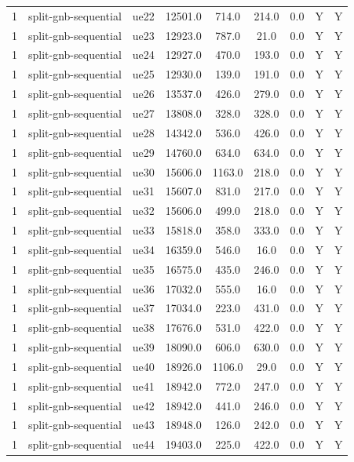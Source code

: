 \begin{table}[ht]
\begin{tabular}{|c|c|c|c|c|c|c|c|c|}
1 & split-gnb-sequential & ue22 & 12501.0 & 714.0 & 214.0 & 0.0 & Y & Y \\
1 & split-gnb-sequential & ue23 & 12923.0 & 787.0 & 21.0 & 0.0 & Y & Y \\
1 & split-gnb-sequential & ue24 & 12927.0 & 470.0 & 193.0 & 0.0 & Y & Y \\
1 & split-gnb-sequential & ue25 & 12930.0 & 139.0 & 191.0 & 0.0 & Y & Y \\
1 & split-gnb-sequential & ue26 & 13537.0 & 426.0 & 279.0 & 0.0 & Y & Y \\
1 & split-gnb-sequential & ue27 & 13808.0 & 328.0 & 328.0 & 0.0 & Y & Y \\
1 & split-gnb-sequential & ue28 & 14342.0 & 536.0 & 426.0 & 0.0 & Y & Y \\
1 & split-gnb-sequential & ue29 & 14760.0 & 634.0 & 634.0 & 0.0 & Y & Y \\
1 & split-gnb-sequential & ue30 & 15606.0 & 1163.0 & 218.0 & 0.0 & Y & Y \\
1 & split-gnb-sequential & ue31 & 15607.0 & 831.0 & 217.0 & 0.0 & Y & Y \\
1 & split-gnb-sequential & ue32 & 15606.0 & 499.0 & 218.0 & 0.0 & Y & Y \\
1 & split-gnb-sequential & ue33 & 15818.0 & 358.0 & 333.0 & 0.0 & Y & Y \\
1 & split-gnb-sequential & ue34 & 16359.0 & 546.0 & 16.0 & 0.0 & Y & Y \\
1 & split-gnb-sequential & ue35 & 16575.0 & 435.0 & 246.0 & 0.0 & Y & Y \\
1 & split-gnb-sequential & ue36 & 17032.0 & 555.0 & 16.0 & 0.0 & Y & Y \\
1 & split-gnb-sequential & ue37 & 17034.0 & 223.0 & 431.0 & 0.0 & Y & Y \\
1 & split-gnb-sequential & ue38 & 17676.0 & 531.0 & 422.0 & 0.0 & Y & Y \\
1 & split-gnb-sequential & ue39 & 18090.0 & 606.0 & 630.0 & 0.0 & Y & Y \\
1 & split-gnb-sequential & ue40 & 18926.0 & 1106.0 & 29.0 & 0.0 & Y & Y \\
1 & split-gnb-sequential & ue41 & 18942.0 & 772.0 & 247.0 & 0.0 & Y & Y \\
1 & split-gnb-sequential & ue42 & 18942.0 & 441.0 & 246.0 & 0.0 & Y & Y \\
1 & split-gnb-sequential & ue43 & 18948.0 & 126.0 & 242.0 & 0.0 & Y & Y \\
1 & split-gnb-sequential & ue44 & 19403.0 & 225.0 & 422.0 & 0.0 & Y & Y \\

\end{tabular}
\end{table}
